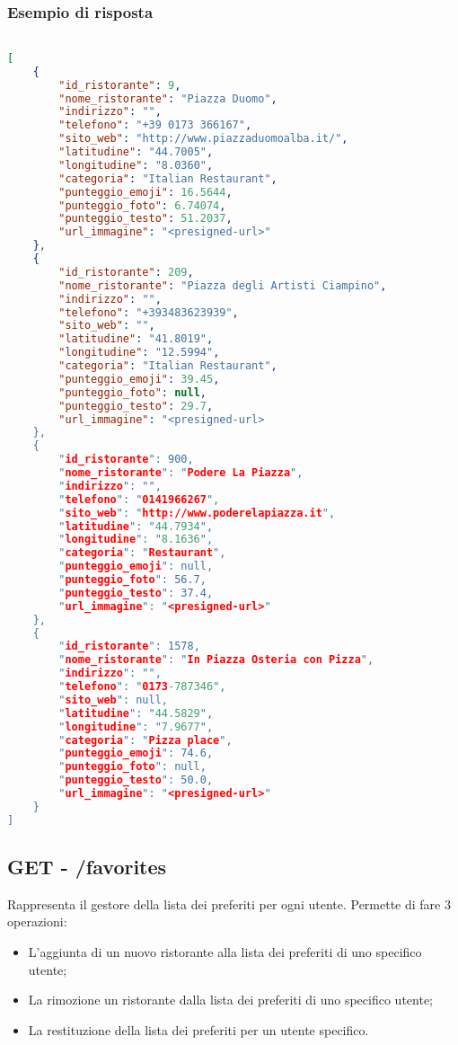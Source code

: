 \subsubsection{Esempio di risposta}
\begin{lstlisting}[language=json]

[
    {
        "id_ristorante": 9,
        "nome_ristorante": "Piazza Duomo",
        "indirizzo": "",
        "telefono": "+39 0173 366167",
        "sito_web": "http://www.piazzaduomoalba.it/",
        "latitudine": "44.7005",
        "longitudine": "8.0360",
        "categoria": "Italian Restaurant",
        "punteggio_emoji": 16.5644,
        "punteggio_foto": 6.74074,
        "punteggio_testo": 51.2037,
        "url_immagine": "<presigned-url>"
    },
    {
        "id_ristorante": 209,
        "nome_ristorante": "Piazza degli Artisti Ciampino",
        "indirizzo": "",
        "telefono": "+393483623939",
        "sito_web": "",
        "latitudine": "41.8019",
        "longitudine": "12.5994",
        "categoria": "Italian Restaurant",
        "punteggio_emoji": 39.45,
        "punteggio_foto": null,
        "punteggio_testo": 29.7,
        "url_immagine": "<presigned-url>
    },
    {
        "id_ristorante": 900,
        "nome_ristorante": "Podere La Piazza",
        "indirizzo": "",
        "telefono": "0141966267",
        "sito_web": "http://www.poderelapiazza.it",
        "latitudine": "44.7934",
        "longitudine": "8.1636",
        "categoria": "Restaurant",
        "punteggio_emoji": null,
        "punteggio_foto": 56.7,
        "punteggio_testo": 37.4,
        "url_immagine": "<presigned-url>"
    },
    {
        "id_ristorante": 1578,
        "nome_ristorante": "In Piazza Osteria con Pizza",
        "indirizzo": "",
        "telefono": "0173-787346",
        "sito_web": null,
        "latitudine": "44.5829",
        "longitudine": "7.9677",
        "categoria": "Pizza place",
        "punteggio_emoji": 74.6,
        "punteggio_foto": null,
        "punteggio_testo": 50.0,
        "url_immagine": "<presigned-url>"
    }
]
\end{lstlisting}

\pagebreak

\subsection{GET - /favorites} 
Rappresenta il gestore della lista dei preferiti per ogni utente. Permette di fare 3 operazioni:

\begin{itemize}
	\item L'aggiunta di un nuovo ristorante alla lista dei preferiti di uno specifico utente;
    \item La rimozione un ristorante dalla lista dei preferiti di uno specifico utente;
    \item La restituzione della lista dei preferiti per un utente specifico.
\end{itemize}



